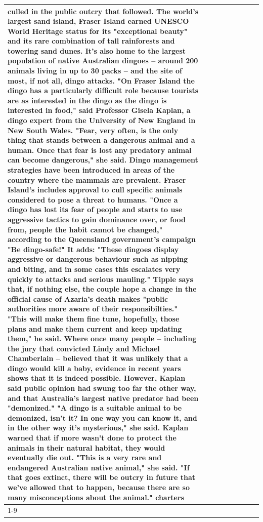 \begin{table}[H]
\begin{tabular}{lllrlllll}
culled in the public outcry that followed. The world's largest sand island, Fraser Island earned UNESCO World Heritage status for its "exceptional beauty" and its rare combination of tall rainforests and towering sand dunes. It's also home to the largest population of native Australian dingoes -- around 200 animals living in up to 30 packs -- and the site of most, if not all, dingo attacks. "On Fraser Island the dingo has a particularly difficult role because tourists are as interested in the dingo as the dingo is interested in food," said Professor Gisela Kaplan, a dingo expert from the University of New England in New South Wales. "Fear, very often, is the only thing that stands between a dangerous animal and a human. Once that fear is lost any predatory animal can become dangerous," she said. Dingo management strategies have been introduced in areas of the country where the mammals are prevalent. Fraser Island's includes approval to cull specific animals considered to pose a threat to humans. "Once a dingo has lost its fear of people and starts to use aggressive tactics to gain dominance over, or food from, people the habit cannot be changed," according to the Queensland government's campaign "Be dingo-safe!" It adds: "These dingoes display aggressive or dangerous behaviour such as nipping and biting, and in some cases this escalates very quickly to attacks and serious mauling." Tipple says that, if nothing else, the couple hope a change in the official cause of Azaria's death makes "public authorities more aware of their responsibilties." "This will make them fine tune, hopefully, those plans and make them current and keep updating them," he said. Where once many people -- including the jury that convicted Lindy and Michael Chamberlain -- believed that it was unlikely that a dingo would kill a baby, evidence in recent years shows that it is indeed possible. However, Kaplan said public opinion had swung too far the other way, and that Australia's largest native predator had been "demonized." "A dingo is a suitable animal to be demonized, isn't it? In one way you can know it, and in the other way it's mysterious," she said. Kaplan warned that if more wasn't done to protect the animals in their natural habitat, they would eventually die out. "This is a very rare and endangered Australian native animal," she said. "If that goes extinct, there will be outcry in future that we've allowed that to happen, because there are so many misconceptions about the animal." charters \\
\cline{1-9}

\end{tabular}
\end{table}

